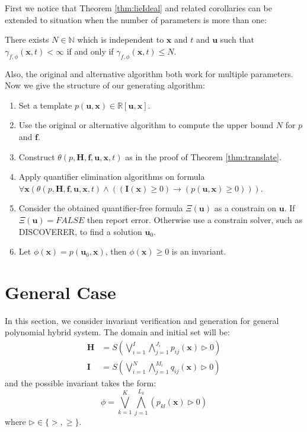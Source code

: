 \documentclass{article}
\begin{document}
First we notice that Theorem \ref{thm:lieIdeal} and related corollaries can be extended to situation when the number of parameters is more than one: 
\begin{Lemma}
\label{cor:paraLieRank}
There exists $N \in \mathbb{N}$ which is independent to $\boldsymbol{x}$ and $t$ and $\boldsymbol{u}$ such that $\gamma_{f, \phi}(\boldsymbol{x}, t) < \infty$ if and only if $\gamma_{f, \phi}(\boldsymbol{x}, t) \leq N$.
\end{Lemma}
Also, the original and alternative algorithm both work for multiple parameters. Now we give the structure of our generating algorithm:
\begin{enumerate}
	\item Set a template $p(\boldsymbol{u}, \boldsymbol{x}) \in \mathbb{R}[\boldsymbol{u},\boldsymbol{x}]$.
	\item Use the original or alternative algorithm to compute the upper bound $N$ for $p$ and $\boldsymbol{f}$.
	\item Construct $\theta(p ,\boldsymbol{H}, \boldsymbol{f},\boldsymbol{u}, \boldsymbol{x}, t)$ as in the proof of Theorem \ref{thm:translate}.
	\item Apply quantifier elimination algorithms on formula $\forall \boldsymbol{x} (\theta(p, \boldsymbol{H}, \boldsymbol{f}, \boldsymbol{u}, \boldsymbol{x}, t) \wedge ((\boldsymbol{I}(\boldsymbol{x}) \geq 0) \rightarrow (p(\boldsymbol{u}, \boldsymbol{x}) \geq 0)))$.
	\item Consider the obtained quantifier-free formula $\Xi(\boldsymbol{u})$ as a constrain on $\boldsymbol{u}$. If $\Xi(\boldsymbol{u}) = \textit{FALSE}$ then report error. Otherwise use a constrain solver, such as DISCOVERER\cite{xia2007discoverer}, to find a solution $\boldsymbol{u}_0$.
	\item Let $\phi(\boldsymbol{x}) = p(\boldsymbol{u}_0, \boldsymbol{x})$, then $\phi(\boldsymbol{x}) \geq 0$ is an invariant.
\end{enumerate}

\section{General Case}
\label{sec:general}
In this section, we consider invariant verification and generation for general polynomial hybrid system. The domain and initial set will be:
\begin{align*}
	\boldsymbol{H} &= S(\bigvee_{i=1}^I \bigwedge_{j=1}^{J_i} p_{ij}(\boldsymbol{x}) \rhd 0) \\
	\boldsymbol{I} &= S(\bigvee_{i=1}^N \bigwedge_{j=1}^{M_i} q_{ij}(\boldsymbol{x}) \rhd 0)
\end{align*}
and the possible invariant takes the form:
\begin{equation*}
	\phi = \bigvee_{k=1}^K \bigwedge_{j=1}^{L_k} (p_{kl}(\boldsymbol{x}) \rhd 0)
\end{equation*}
where $\rhd \in \{ >, \geq \}$.
\end{document}
